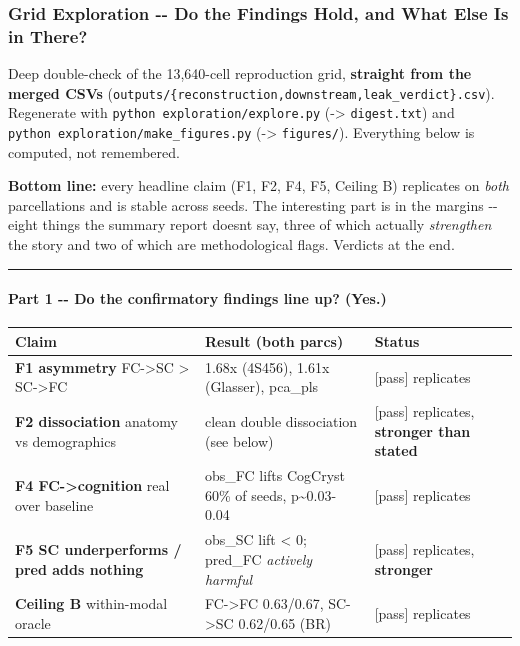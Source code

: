 \subsubsection{Grid Exploration -\/- Do the Findings Hold, and What Else Is in There?}\label{grid-exploration----do-the-findings-hold-and-what-else-is-in-there}

Deep double-check of the 13,640-cell reproduction grid, \textbf{straight from the merged CSVs} (\texttt{outputs/\{reconstruction,downstream,leak\_verdict\}.csv}). Regenerate with \texttt{python\ exploration/explore.py} (-\textgreater{} \texttt{digest.txt}) and \texttt{python\ exploration/make\_figures.py} (-\textgreater{} \texttt{figures/}). Everything below is computed, not remembered.

\textbf{Bottom line:} every headline claim (F1, F2, F4, F5, Ceiling B) replicates on \emph{both} parcellations and is stable across seeds. The interesting part is in the margins -\/- eight things the summary report doesn\textquotesingle t say, three of which actually \emph{strengthen} the story and two of which are methodological flags. Verdicts at the end.

\begin{center}\rule{0.5\linewidth}{0.5pt}\end{center}

\paragraph{Part 1 -\/- Do the confirmatory findings line up? (Yes.)}\label{part-1----do-the-confirmatory-findings-line-up-yes}

{\def\LTcaptype{none} %
\begin{longtable}[]{@{}lll@{}}
\toprule\noalign{}
Claim & Result (both parcs) & Status \\
\midrule\noalign{}
\endhead
\bottomrule\noalign{}
\endlastfoot
\textbf{F1 asymmetry} FC-\textgreater SC \textgreater{} SC-\textgreater FC & 1.68x (4S456), 1.61x (Glasser), pca\_pls & {[}pass{]} replicates \\
\textbf{F2 dissociation} anatomy vs demographics & clean double dissociation (see below) & {[}pass{]} replicates, \textbf{stronger than stated} \\
\textbf{F4 FC-\textgreater cognition} real over baseline & obs\_FC lifts CogCryst 60\% of seeds, p\textasciitilde0.03-0.04 & {[}pass{]} replicates \\
\textbf{F5 SC underperforms / pred adds nothing} & obs\_SC lift \textless{} 0; pred\_FC \emph{actively harmful} & {[}pass{]} replicates, \textbf{stronger} \\
\textbf{Ceiling B} within-modal oracle & FC-\textgreater FC 0.63/0.67, SC-\textgreater SC 0.62/0.65 (BR) & {[}pass{]} replicates \\
\end{longtable}
}

